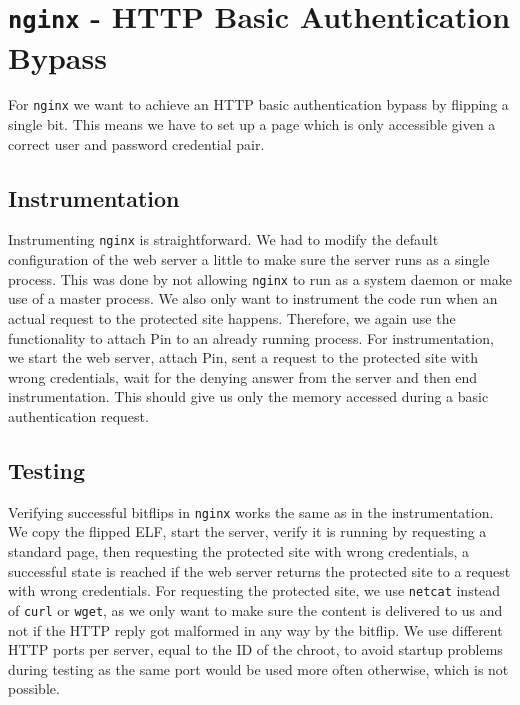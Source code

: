 \section{\texttt{nginx} - HTTP Basic Authentication Bypass}

For \texttt{nginx} we want to achieve an HTTP basic authentication bypass by
flipping a single bit. This means we have to set up a page which is only
accessible given a correct user and password credential pair.

\subsection{Instrumentation}

Instrumenting \texttt{nginx} is straightforward. We had to modify the default
configuration of the web server a little to make sure the server runs as a
single process. This was done by not allowing \texttt{nginx} to run as a system
daemon or make use of a master process. We also only want to instrument the code
run when an actual request to the protected site happens. Therefore, we again
use the functionality to attach Pin to an already running process. For
instrumentation, we start the web server, attach Pin, sent a request to the
protected site with wrong credentials, wait for the denying answer from the
server and then end instrumentation. This should give us only the memory
accessed during a basic authentication request.

\subsection{Testing}

Verifying successful bitflips in \texttt{nginx} works the same as in the
instrumentation. We copy the flipped ELF, start the server, verify it is running
by requesting a standard page, then requesting the protected site with wrong
credentials, a successful state is reached if the web server returns the
protected site to a request with wrong credentials. For requesting the
protected site, we use \texttt{netcat} instead of \texttt{curl} or
\texttt{wget}, as we only want to make sure the content is delivered to us and
not if the HTTP reply got malformed in any way by the bitflip. We use different
HTTP ports per server, equal to the ID of the chroot, to avoid startup problems
during testing as the same port would be used more often otherwise, which is
not possible.

